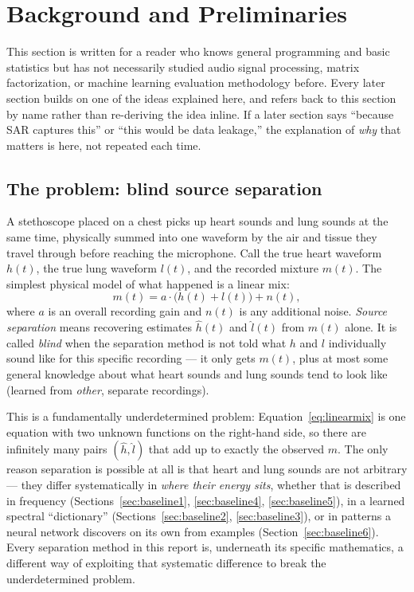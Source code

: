 \documentclass[11pt]{article}
\begin{document}
\section{Background and Preliminaries}
\label{sec:background}

This section is written for a reader who knows general programming and
basic statistics but has not necessarily studied audio signal processing,
matrix factorization, or machine learning evaluation methodology before.
Every later section builds on one of the ideas explained here, and refers
back to this section by name rather than re-deriving the idea inline. If a
later section says ``because SAR captures this'' or ``this would be data
leakage,'' the explanation of \emph{why} that matters is here, not
repeated each time.

\subsection{The problem: blind source separation}
\label{sec:bg-bss}

A stethoscope placed on a chest picks up heart sounds and lung sounds at
the same time, physically summed into one waveform by the air and tissue
they travel through before reaching the microphone. Call the true heart
waveform $h(t)$, the true lung waveform $l(t)$, and the recorded mixture
$m(t)$. The simplest physical model of what happened is a linear mix:
\begin{equation}
m(t) = a\cdot\bigl(h(t) + l(t)\bigr) + n(t),
\label{eq:linearmix}
\end{equation}
where $a$ is an overall recording gain and $n(t)$ is any additional noise.
\emph{Source separation} means recovering estimates $\hat h(t)$ and
$\hat l(t)$ from $m(t)$ alone. It is called \emph{blind} when the
separation method is not told what $h$ and $l$ individually sound like for
this specific recording --- it only gets $m(t)$, plus at most some general
knowledge about what heart sounds and lung sounds tend to look like
(learned from \emph{other}, separate recordings).

This is a fundamentally underdetermined problem: Equation~\ref{eq:linearmix}
is one equation with two unknown functions on the right-hand side, so there
are infinitely many pairs $(\hat h, \hat l)$ that add up to exactly the
observed $m$. The only reason separation is possible at all is that heart
and lung sounds are not arbitrary --- they differ systematically in
\emph{where their energy sits}, whether that is described in frequency
(Sections~\ref{sec:baseline1}, \ref{sec:baseline4}, \ref{sec:baseline5}), in
a learned spectral ``dictionary'' (Sections~\ref{sec:baseline2},
\ref{sec:baseline3}), or in patterns a neural network discovers on its own
from examples (Section~\ref{sec:baseline6}). Every separation method in
this report is, underneath its specific mathematics, a different way of
exploiting that systematic difference to break the underdetermined problem.
\end{document}
